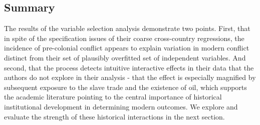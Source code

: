 \subsection{Summary}

The results of the variable selection analysis demonstrate two points. First, that in spite of the specification issues of their coarse cross-country regressions, the incidence of pre-colonial conflict appears to explain variation in modern conflict distinct from their set of plausibly overfitted set of independent variables. And second, that the process detects intuitive interactive effects in their data that the authors do not explore in their analysis - that the effect is especially magnified by subsequent exposure to the slave trade and the existence of oil, which supports the academic literature pointing to the central importance of historical institutional development in determining modern outcomes. We explore and evaluate the strength of these historical interactions in the next section. 
